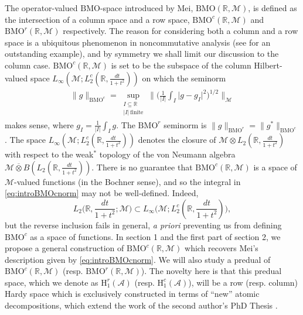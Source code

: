 \documentclass[psamsfonts]{amsart}
\newcommand{\Linfty}{L_\infty}
\newcommand{\Ltwo}{L_2}
\newcommand{\Ltwoc}{L_2^c}
\newcommand{\Honec}{\mathrm{H}_1^c}
\newcommand{\Honer}{\mathrm{H}_1^r}
\newcommand{\BMOc}{\mathrm{BMO}^c}
\newcommand{\BMOr}{\mathrm{BMO}^r}
\newcommand{\BMO}{\mathrm{BMO}}
\newcommand{\Hardyc}{\Honec(\mathcal{A})}
\newcommand{\Hardyr}{\Honer(\mathcal{A})}
\begin{document}
    
The operator-valued $\BMO$-space introduced by
Mei, $\BMO(\mathbb{R},\mathcal{M})$, is defined as the
intersection of a column space and a row space,
$\BMOc(\mathbb{R},\mathcal{M})$ and $\BMOr(\mathbb{R},\mathcal{M})$
respectively. The reason for considering both a column and a row space
is a ubiquitous phenomenon in noncommutative analysis (see \cite{LP86}
for an outstanding example), and by symmetry we shall limit our
discussion to the column case. $\BMOc(\mathbb{R},\mathcal{M})$ is set
to be the subspace of the column Hilbert-valued space \cite{JLX06}
$\Linfty(\mathcal{M};\Ltwoc(\mathbb{R},\frac{dt}{1+t^2}))$ on  which
the seminorm
\begin{align}\label{eq:introBMOcnorm}\tag{MBMO}
        \|g\|_{\BMOc} = \sup_{\substack{I\subseteq \mathbb{R} \\ |I| \ \mathrm{finite}}}\Big\| \Big( \frac{1}{|I|} \int_I \big| g - g_I \big|^2 \Big)^{1/2} \Big\|_{\mathcal{M}}
    \end{align}
makes sense, where $g_I = \frac{1}{|I|} \int_I g$. The $\BMOr$ seminorm is $\|g\|_{\BMOr} = \|g^*\|_{\BMOc}$. The space $\Linfty(\mathcal{M};\Ltwoc(\mathbb{R},\frac{dt}{1+t^2}))$ denotes the closure of $\mathcal{M} \otimes \Ltwo(\mathbb{R},\frac{dt}{1+t^2})$ with respect to the weak$^*$ topology of the von Neumann algebra $\mathcal{M} \overline{\otimes} B(\Ltwo(\mathbb{R},\frac{dt}{1+t^2}))$. There is no guarantee that $\BMOc(\mathbb{R},\mathcal{M})$ is a space of $\mathcal{M}$-valued functions (in the Bochner sense), and so the integral in \eqref{eq:introBMOcnorm} may not be well-defined. Indeed,
$$
\Ltwo\big(\mathbb{R},\frac{dt}{1+t^2};\mathcal{M}\big) \subset \Linfty\big(\mathcal{M};\Ltwoc(\mathbb{R},\frac{dt}{1+t^2})\big),
$$
but the reverse inclusion fails in general, \emph{a priori} preventing us from defining $\BMOc$ as a space of functions. In section 1 and the first part of section 2, we propose a general construction of $\BMOc(\mathbb{R},\mathcal{M})$ which recovers Mei's description given by \eqref{eq:introBMOcnorm}. We will also study a predual of $\BMOc(\mathbb{R},\mathcal{M})$ (resp. $\BMOr(\mathbb{R},\mathcal{M})$). The novelty here is that this predual space, which we denote as $\Hardyr$ (resp. $\Hardyc$), will be a row (resp. column) Hardy space which is exclusively constructed in terms of ``new'' atomic decompositions, which extend the work of the second author's PhD Thesis \cite{R01}.
\end{document}
